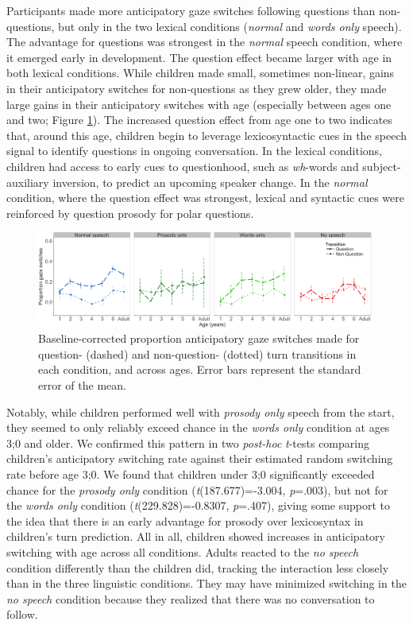 \documentclass[authoryear, 12pt]{elsarticle}
\begin{document}
Participants made more anticipatory gaze switches following questions than non-questions, but only in the two lexical conditions (\textit{normal} and \textit{words only} speech). The advantage for questions was strongest in the \textit{normal} speech condition, where it emerged early in development. The question effect became larger with age in both lexical conditions. While children made small, sometimes non-linear, gains in their anticipatory switches for non-questions as they grew older, they made large gains in their anticipatory switches with age (especially between ages one and two; Figure \ref{fig:questionsEN}). The increased question effect from age one to two indicates that, around this age, children begin to leverage lexicosyntactic cues in the speech signal to identify questions in ongoing conversation. In the lexical conditions, children had access to early cues to questionhood, such as \textit{wh}-words and subject-auxiliary inversion, to predict an upcoming speaker change. In the \textit{normal} condition, where the question effect was strongest, lexical and syntactic cues were reinforced by question prosody for polar questions.

\begin{figure}[t]
\begin{center}
\includegraphics[width=0.99\textwidth]{figures/FIG-QvsNQ-EN.png}
\end{center}
\caption{Baseline-corrected proportion anticipatory gaze switches made for question- (dashed) and non-question- (dotted) turn transitions in each condition, and across ages. Error bars represent the standard error of the mean.} 
\label{fig:questionsEN}
\end{figure}

Notably, while children performed well with \textit{prosody only} speech from the start, they seemed to only reliably exceed chance in the \textit{words only} condition at ages 3;0 and older. We confirmed this pattern in two \textit{post-hoc} \textit{t}-tests comparing children's anticipatory switching rate against their estimated random switching rate before age 3;0. We found that children under 3;0 significantly exceeded chance for the \textit{prosody only} condition (\textit{t}(187.677)=-3.004, \textit{p}=.003), but not for the \textit{words only} condition (\textit{t}(229.828)=-0.8307, \textit{p}=.407), giving some support to the idea that there is an early advantage for prosody over lexicosyntax in children's turn prediction. All in all, children showed increases in anticipatory switching with age across all conditions. Adults reacted to the \textit{no speech} condition differently than the children did, tracking the interaction less closely than in the three linguistic conditions. They may have minimized switching in the \textit{no speech} condition because they realized that there was no conversation to follow.
\end{document}
